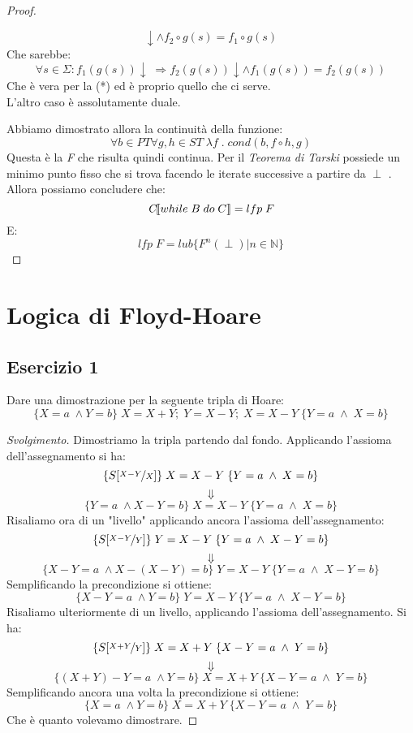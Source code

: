 \begin{proof}
\begin{itemize}
$$    \downarrow \land f_2 \circ g(s) = f_1 \circ g(s) $$
    Che sarebbe:
    $$ \forall s \in \Sigma : f_{1}(g(s)) \downarrow \; \Rightarrow f_{2}(g(s))
    \downarrow \land f_{1}(g(s)) = f_{2}(g(s)) $$
    Che è vera per la (*) ed è proprio quello che ci serve. \\
    L'altro caso è assolutamente duale.
  \end{itemize}
  Abbiamo dimostrato allora la continuità della funzione:
  $$ \forall b \in PT \forall g,h \in ST \; \lambda f \; . \; cond(b,f \circ h,g) $$
  Questa è la \emph{F} che risulta quindi continua. Per il \emph{Teorema di Tarski} possiede un minimo punto fisso che si trova facendo le iterate successive a partire da $\perp$ . Allora possiamo concludere che:
  $$ \emph{C} \llbracket while \; B \; do \; C \rrbracket = lfp \; F $$
  E:
  $$ lfp \; F = lub \{ F^n(\perp ) | n \in \mathbb{N} \} $$
\end{proof}

\section{Logica di Floyd-Hoare}
\newcommand{\mactext}[1]{\text{\texttt{#1}}}

\subsection{Esercizio 1}
Dare una dimostrazione per la seguente tripla di Hoare:
$$ \{X=a \; \land Y=b\} \; X=X+Y; \; Y=X-Y; \; X=X-Y \; \{Y=a \; \land \; X=b\} $$

\begin{proof}[Svolgimento]
Dimostriamo la tripla partendo dal fondo. Applicando l'assioma dell'assegnamento si ha:
$$ \{S[\nicefrac{X-Y}{X}] \} \; X=X-Y \; \{Y=a \; \land \; X=b\} $$
$$ \Downarrow $$
$$ \{Y=a \; \land X-Y=b \} \; X=X-Y \; \{Y=a \; \land \; X=b\} $$
Risaliamo ora di un "livello" applicando ancora l'assioma dell'assegnamento:
$$ \{S[\nicefrac{X-Y}{Y}] \} \; Y=X-Y \; \{Y=a \; \land \; X-Y=b\} $$
$$ \Downarrow $$
$$ \{X-Y=a \; \land X-(X-Y)=b \} \; Y=X-Y \; \{Y=a \; \land \; X-Y=b\} $$
Semplificando la precondizione si ottiene:
$$ \{X-Y=a \; \land Y=b \} \; Y=X-Y \; \{Y=a \; \land \; X-Y=b\} $$
Risaliamo ulteriormente di un livello, applicando l'assioma dell'assegnamento. Si ha:
$$ \{S[\nicefrac{X+Y}{Y}] \} \; X=X+Y \; \{X-Y=a \; \land \; Y=b\} $$
$$ \Downarrow $$
$$ \{(X+Y)-Y=a \; \land Y=b \} \; X=X+Y \; \{X-Y=a \; \land \; Y=b\} $$
Semplificando ancora una volta la precondizione si ottiene:
$$ \{X=a \; \land Y=b \} \; X=X+Y \; \{X-Y=a \; \land \; Y=b\} $$
Che è quanto volevamo dimostrare.
\end{proof}

